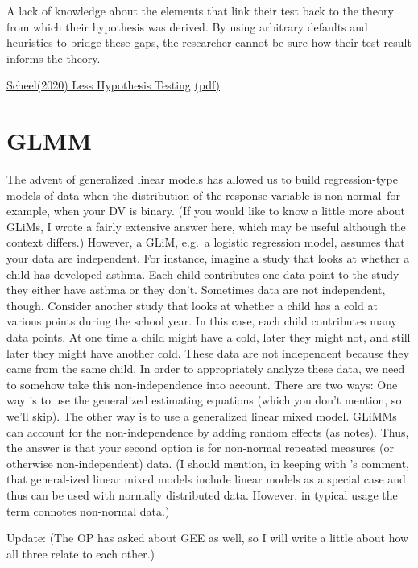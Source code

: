 \documentclass[
]{book}
\begin{document}
A lack of knowledge about the elements that link their test
back to the theory from which their hypothesis was
derived. By using arbitrary defaults and heuristics to
bridge these gaps, the researcher cannot be sure how
their test result informs the theory.

\href{https://journals.sagepub.com/doi/full/10.1177/1745691620966795}{Scheel(2020) Less Hypothesis Testing}
\href{pdf/Scheel_2020_Less_Hypothesis_Testing.pdf}{(pdf)}

\hypertarget{glmm}{%
\section{GLMM}\label{glmm}}

The advent of generalized linear models has allowed us to build regression-type models of data when the distribution of the response variable is non-normal--for example, when your DV is binary. (If you would like to know a little more about GLiMs, I wrote a fairly extensive answer here, which may be useful although the context differs.) However, a GLiM, e.g.~a logistic regression model, assumes that your data are independent. For instance, imagine a study that looks at whether a child has developed asthma. Each child contributes one data point to the study--they either have asthma or they don't. Sometimes data are not independent, though. Consider another study that looks at whether a child has a cold at various points during the school year. In this case, each child contributes many data points. At one time a child might have a cold, later they might not, and still later they might have another cold. These data are not independent because they came from the same child. In order to appropriately analyze these data, we need to somehow take this non-independence into account. There are two ways: One way is to use the generalized estimating equations (which you don't mention, so we'll skip). The other way is to use a generalized linear mixed model. GLiMMs can account for the non-independence by adding random effects (as \citet{MichaelChernick} notes). Thus, the answer is that your second option is for non-normal repeated measures (or otherwise non-independent) data. (I should mention, in keeping with \citet{Macro}'s comment, that general-ized linear mixed models include linear models as a special case and thus can be used with normally distributed data. However, in typical usage the term connotes non-normal data.)

Update: (The OP has asked about GEE as well, so I will write a little about how all three relate to each other.)
\end{document}
